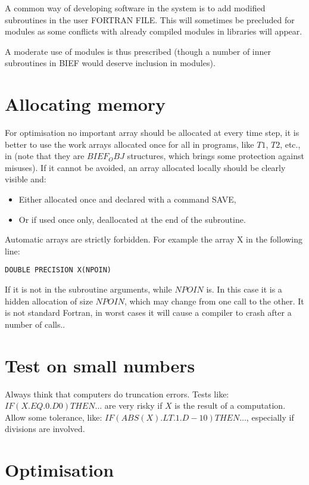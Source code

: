 A common way of developing software in the \telemacsystem system is to add modified
subroutines in the user FORTRAN FILE. This will sometimes be precluded for
modules as some conflicts with already compiled modules in libraries will
appear.

A moderate use of modules is thus prescribed (though a number of inner
subroutines in BIEF would deserve inclusion in modules).

\section{Allocating memory}


For optimisation no important array should be allocated at every time step, it
is better to use the work arrays allocated once for all in \telemacsystem programs,
like $T1$, $T2$, etc., in  (note that they are $BIEF_OBJ$ structures, which
brings some protection against misuses).  If it cannot be avoided, an array
allocated locally should be clearly visible and:\\
\begin{itemize}
\item Either allocated once and declared with a command SAVE,
\item Or if used once only, deallocated at the end of the subroutine.
\end{itemize}

Automatic arrays are strictly forbidden. For example the array X in the
following line:
\begin{lstlisting}
DOUBLE PRECISION X(NPOIN)
\end{lstlisting}

If it is not in the subroutine arguments, while $NPOIN$ is. In this case it is a
hidden allocation of size $NPOIN$, which may change from one call to the other.
It is not standard Fortran, in worst cases it will cause a compiler to crash
after a number of calls..

\section{Test on small numbers}

Always think that computers do truncation errors. Tests like: $IF(X.EQ.0.D0)
THEN…$ are very risky if $X$ is the result of a computation. Allow some tolerance,
like: $IF(ABS(X).LT.1.D-10) THEN…$, especially if divisions are involved.

\section{Optimisation}

